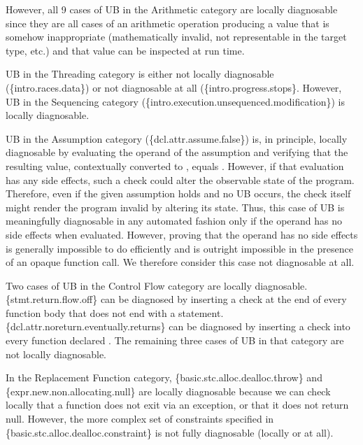 However, all 9 cases of UB in the Arithmetic category are locally diagnosable since they are all cases of an arithmetic operation producing a value that is somehow inappropriate (mathematically invalid, not representable in the target type, etc.) and that value can be inspected at run time.

UB in the Threading category is either not locally diagnosable (\{intro.races.data\}) or not diagnosable at all (\{intro.progress.stops\}. However, UB in the Sequencing category (\{intro.execution.unsequenced.modification\}) is locally diagnosable.

UB in the Assumption category (\{dcl.attr.assume.false\}) is, in principle, locally diagnosable by evaluating the operand of the assumption and verifying that the resulting value, contextually converted to , equals . However, if that evaluation has any side effects, such a check could alter the observable state of the program. Therefore, even if the given assumption holds and no UB occurs, the check itself might render the program invalid by altering its state. Thus, this case of UB is meaningfully diagnosable in any automated fashion only if the operand has no side effects when evaluated. However, proving that the operand has no side effects is generally impossible to do efficiently and is outright impossible in the presence of an opaque function call. We therefore consider this case not diagnosable at all.

Two cases of UB in the Control Flow category are locally diagnosable. \{stmt.return.flow.off\} can be diagnosed by inserting a check at the end of every function body that does not end with a  statement. \{dcl.attr.noreturn.eventually.returns\} can be diagnosed by inserting a check into every function declared \tcode{[[noreturn]]}. The remaining three cases of UB in that category are not locally diagnosable.

In the Replacement Function category,  \{basic.stc.alloc.dealloc.throw\} and \{expr.new.non.allocating.null\} are locally diagnosable because we can check locally that a function does not exit via an exception, or that it does not return null. However, the more complex set of constraints specified in \{basic.stc.alloc.dealloc.constraint\} is not fully diagnosable  (locally or at all).


